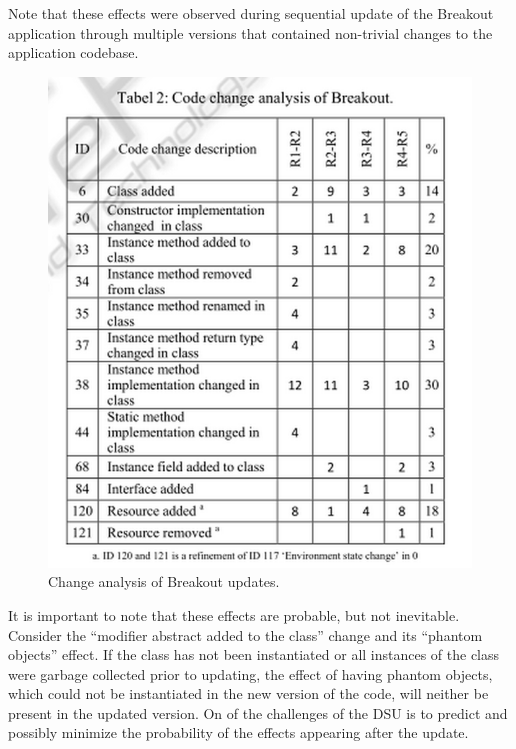 Note that these effects were observed during sequential update of the Breakout
application through multiple versions that contained non-trivial changes to the
application codebase.

\begin{figure}[ht!]
\begin{center}
\leavevmode
\includegraphics[scale=0.6]{../images/fig2.png}
\end{center}
\caption{Change analysis of Breakout updates.
\label{manual_change_analysis}}
\end{figure}

It is important to note that these effects are probable, but not inevitable.
Consider the “modifier abstract added to the class” change and its “phantom
objects” effect. If the class has not been instantiated or all instances of the
class were garbage collected prior to updating, the effect of having phantom
objects, which could not be instantiated in the new version of the code, will
neither be present in the updated version.
On of the challenges of the DSU is to predict and possibly minimize the
probability of the effects appearing after the update.

